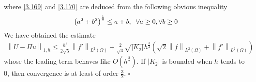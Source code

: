 \documentclass[a4paper]{article}
\numberwithin{equation}{section}
\begin{document}
where \eqref{3.169} and \eqref{3.170} are deduced from the following obvious inequality
\begin{align}
{\left( {{a^2} + {b^2}} \right)^{\frac{1}{2}}} \le a + b,\hspace{0.2cm}\forall a \ge 0,\forall b \ge 0
\end{align}
We have obtained the estimate
\begin{align}
{\left\| {U - \Pi u} \right\|_{1,h}} \le \frac{{{h^2}}}{{2\sqrt 5 }}{\left\| {f'} \right\|_{{L^2}\left( \Omega  \right)}} + \frac{2}{{\sqrt 3 }}\sqrt {\left| {{K_2}} \right|} {h^{\frac{3}{2}}}\left( {\sqrt 2 {{\left\| f \right\|}_{{L^2}\left( \Omega  \right)}} + {{\left\| {f'} \right\|}_{{L^2}\left( \Omega  \right)}}} \right)
\end{align}
whose the leading term behaves like $O\left(h^{\frac{2}{2}}\right)$. If ${\left| {{K_2}} \right|}$ is bounded when $h$ tends to 0, then convergence is at least of order $\frac{3}{2}$. \hfill $\square$
\end{document}
